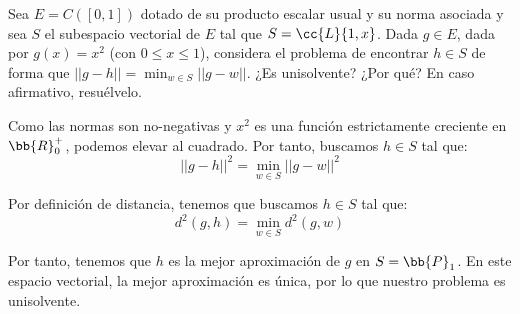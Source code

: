 \begin{ejercicio}
    Sea $E = C([0, 1])$ dotado de su producto escalar usual y su norma asociada y sea $S$ el subespacio vectorial de $E$ tal que $S=\cc{L}\{1,x\}$. Dada $g \in E$, dada por $g(x) = x^2$ (con $0 \leq x \leq 1$), considera el problema de encontrar $h \in S$ de forma que $\displaystyle ||g - h|| = \min_{w\in S}{||g - w||}$. ¿Es unisolvente? ¿Por qué? En caso afirmativo, resuélvelo.

    Como las normas son no-negativas y $x^2$ es una función estrictamente creciente en $\bb{R}^+_0$, podemos elevar al cuadrado. Por tanto, buscamos $h\in S$ tal que:
    \begin{equation*}
        ||g - h||^2 = \min_{w\in S}{||g - w||^2}
    \end{equation*}

    Por definición de distancia, tenemos que buscamos $h\in S$ tal que:
    \begin{equation*}
        d^2(g, h) = \min_{w\in S}{d^2(g,w)}
    \end{equation*}

    Por tanto, tenemos que $h$ es la mejor aproximación de $g$ en $S=\bb{P}_1$. En este espacio vectorial, la mejor aproximación es única, por lo que nuestro problema es unisolvente.
\end{ejercicio}

